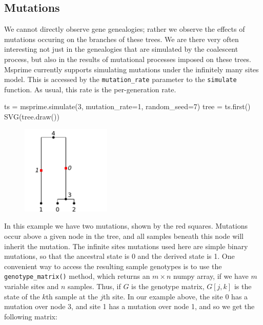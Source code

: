 \documentclass[graybox]{svmult}
\newcommand{\includenbimage}[1]{\begin{center}\texttt{[image: \#1]}\end{center}}
\begin{document}
    \subsection{Mutations}\label{mutations}

We cannot directly observe gene genealogies; rather we observe the
effects of mutations occuring on the branches of these trees. We are
there very often interesting not just in the genealogies that are
simulated by the coalescent process, but also in the results of
mutational processes imposed on these trees. Msprime currently supports
simulating mutations under the infinitely many sites model. This is
accessed by the \texttt{mutation\_rate} parameter to the
\texttt{simulate} function. As usual, this rate is the per-generation
rate.

\begin{pythoncode}
ts = msprime.simulate(3, mutation_rate=1, random_seed=7)
tree = ts.first()
SVG(tree.draw())
\end{pythoncode}

\begin{figure}
  \begin{center}
    \includegraphics[width=0.38\textwidth]{images/simulations_19_0.pdf}
  \end{center}
\end{figure}
    In this example we have two mutations, shown by the red squares.
Mutations occur above a given node in the tree, and all samples beneath
this node will inherit the mutation. The infinite sites mutations used
here are simple binary mutations, so that the ancestral state is 0 and
the derived state is 1. One convenient way to access the resulting
sample genotypes is to use the \texttt{genotype\_matrix()} method, which
returns an \(m \times n\) numpy array, if we have \(m\) variable sites
and \(n\) samples. Thus, if \(G\) is the genotype matrix, \(G[j, k]\) is
the state of the \(k\)th sample at the \(j\)th site. In our example
above, the site 0 has a mutation over node 3, and site 1 has a mutation
over node 1, and so we get the following matrix:
\end{document}
